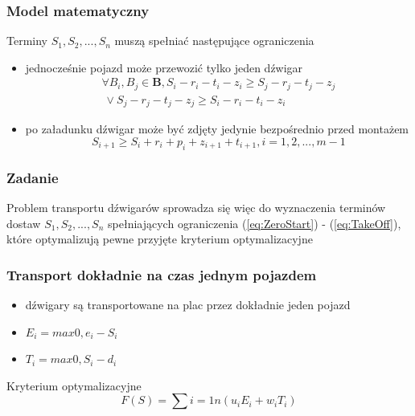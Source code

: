 \documentclass{beamer}
\begin{document}
 \begin{frame}
 \frametitle{Model matematyczny}
 
 \begin{block}{Terminy $S_1, S_2,...,S_n $ muszą spełniać następujące ograniczenia}
 \begin{itemize}
       \item jednocześnie pojazd może przewozić tylko jeden dźwigar
     \begin{equation}\label{eq:OneVehicle}
     \begin{split}
      \forall B_i, B_j \in \textbf{B}, S_i - r_i - t_i - z_i \ge S_j - r_j - t_j - z_j
      \\ \   \vee S_j - r_j - t_j - z_j \ge S_i - r_i - t_i - z_i
     \end{split}
     \end{equation}
     \item po załadunku dźwigar może być zdjęty jedynie bezpośrednio przed montażem
      \begin{equation}\label{eq:TakeOff}
      S_{i+1} \ge S_i + r_i + p_i + z_{i+1} + t_{i+1}, i = 1,2,...,m-1
      \end{equation}        
 \end{itemize}
 \end{block}
\end{frame}

\begin{frame}
 \frametitle{Zadanie}
 \begin{block}{}
 Problem transportu dźwigarów sprowadza się więc do wyznaczenia terminów dostaw $S_1, S_2,...,S_n $ spełniających ograniczenia (\ref{eq:ZeroStart})
 - (\ref{eq:TakeOff}), które optymalizują pewne przyjęte kryterium optymalizacyjne
  
 \end{block}
\end{frame}


\begin{frame}
 \frametitle{Transport dokładnie na czas jednym pojazdem}
 \begin{itemize}
  \item dźwigary są transportowane na plac przez dokładnie jeden pojazd
 \end{itemize}
 \begin{block}{}
 \begin{itemize}
 \item $ E_i = max{0, e_i - S_i} $ 
 \item $ T_i = max{0, S_i - d_i} $
 \end{itemize}
 \end{block}
 
 \begin{block}{Kryterium optymalizacyjne}
  \begin{equation}
   F(S) = \sum{i=1}{n}(u_iE_i + w_iT_i) 
  \end{equation}
 \end{block}

\end{frame}
\end{document}
